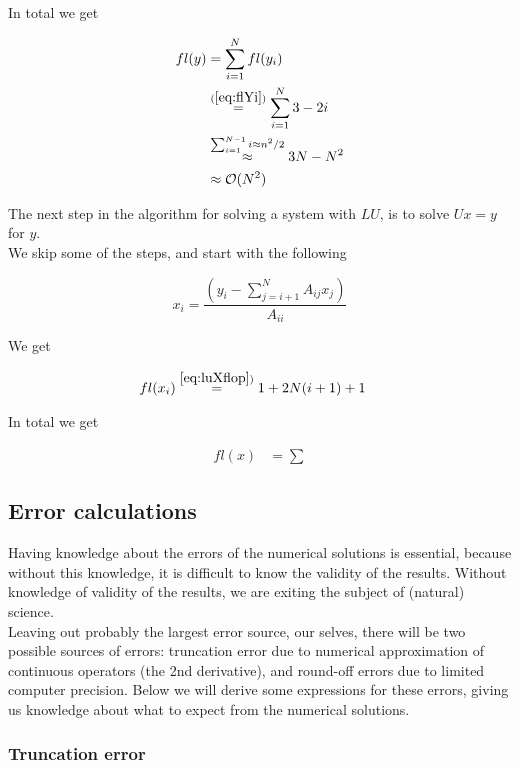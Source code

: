 \documentclass{article}
\begin{document}
In total we get

\begin{align}
fl(y) &= \sum_{i=1}^{N} fl(y_i)\\
&\stackrel{(\ref{eq:flYi})}{=} \sum_{i=1}^{N} 3 -2i\\
&\stackrel{\sum_{i=1}^{N-1} i\approx n^2/2}{\approx}{3N - N^2  }\\
&\approx \mathcal{O}(N^2)
\end{align}

The next step in the algorithm for solving a system with $LU$, is to solve $Ux = y$ for $y$.\\

We skip some of the steps, and start with the following

\begin{equation}\label{eq:luXflop}
x_i = \frac{(y_i - \sum_{j=i+1}^N A_{ij} x_j)}{A_{ii}}
\end{equation}

We get

\begin{align}
fl(x_i) & \stackrel{\ref{eq:luXflop})}{=} 1 + 2N(i+1) + 1
\end{align}

In total we get

\begin{align}
fl(x) &= \sum
\end{align}

\subsection{Error calculations}
Having knowledge about the errors of the numerical solutions is essential, because without this knowledge, it is difficult to know the validity of the results. Without knowledge of validity of the results, we are exiting the subject of (natural) science. \\

Leaving out probably the largest error source, our selves, there will be two possible sources of errors: truncation error due to numerical approximation of continuous operators (the 2nd derivative), and round-off errors due to limited computer precision. Below we will derive some expressions for these errors, giving us knowledge about what to expect from the numerical solutions.

\subsubsection{Truncation error}
\end{document}
